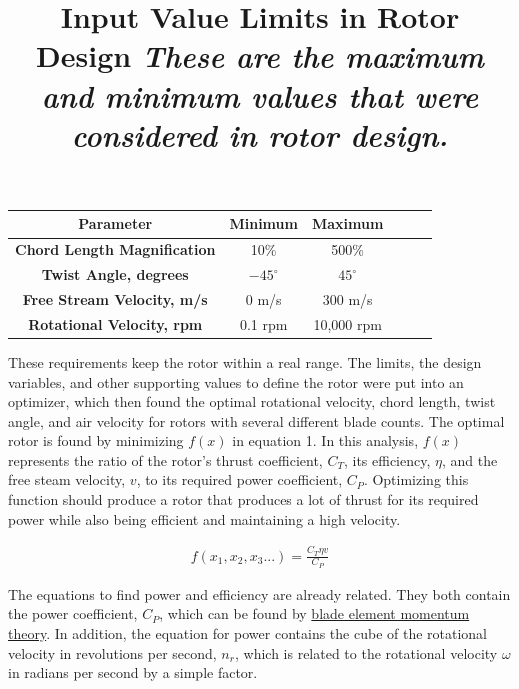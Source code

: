 \documentclass{article}
\begin{document}
\begin{table}[bp]
	\centering
	\title{Input Value Limits in Rotor Design \newline}
	\title{\emph{These are the maximum and minimum values that were considered in rotor design.}} \label{table:1} \newline
	\begin{tabular}{| c | c | c | c | c | c |}
		 \hline
		 \textbf{Parameter} & Minimum & Maximum \\ \hline
		 \textbf{Chord Length Magnification} & 10\% & 500\% \\ \newline
		 \textbf{Twist Angle, degrees} & $-45^{\circ}$ & $45^{\circ}$ \\ \newline
		 \textbf{Free Stream Velocity, m/s} & 0 m/s & 300 m/s \\ \newline
		 \textbf{Rotational Velocity, rpm} & 0.1 rpm & 10,000 rpm \\ \hline
	\end{tabular}
\end{table}

These requirements keep the rotor within a real range. The limits, the design variables, and other supporting values to define the rotor were put into an optimizer, which then found the optimal rotational velocity, chord length, twist angle, and air velocity for rotors with several different blade counts. The optimal rotor is found by minimizing $f(x)$ in equation 1. In this analysis, $f(x)$ represents the ratio of the rotor's thrust coefficient, $C_{T}$, its efficiency, $\eta$, and the free steam velocity, $v$, to its required power coefficient, $C_{P}$. Optimizing this function should produce a rotor that produces a lot of thrust for its required power while also being efficient and maintaining a high velocity. \newline

\begin{equation}
\begin{aligned}
	f(x_{1}, x_{2}, x_{3}...) = \frac{C_{T} \eta v}{C_{P}}
\end{aligned}
\end{equation}

The equations to find power and efficiency are already related. They both contain the power coefficient, $C_{P}$, which can be found by \hyperlink{BEM}{blade element momentum theory}. In addition, the equation for power contains the cube of the rotational velocity in revolutions per second, $n_{r}$, which is related to the rotational velocity $\omega$ in radians per second by a simple factor. \newline
\end{document}
